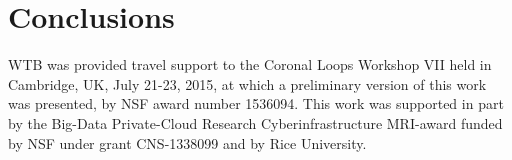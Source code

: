 \documentclass[preprint,linenumbers]{aastex}
\begin{document}
	\section{Conclusions}
	\label{sec:conclusions}
	\acknowledgments
	WTB was provided travel support to the Coronal Loops Workshop VII held in Cambridge, UK, July 21-23, 2015, at which a preliminary version of this work was presented, by NSF award number 1536094. This work was supported in part by the Big-Data Private-Cloud Research Cyberinfrastructure MRI-award funded by NSF under grant CNS-1338099 and by Rice University.
	
	
\end{document}
